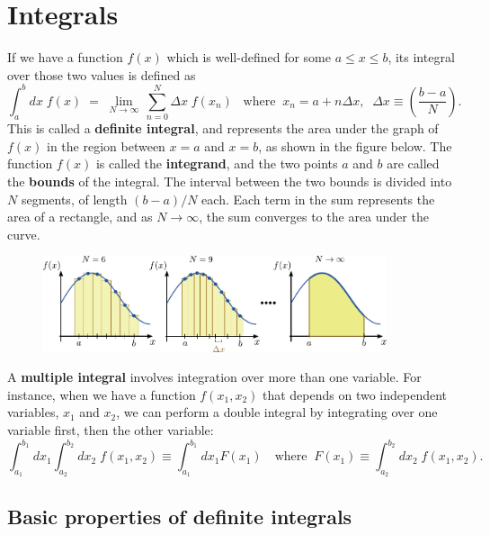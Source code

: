 \documentclass[10pt,a4paper]{article}
\begin{document}
\setcounter{page}{14}

\section{Integrals}
\label{integrals}

If we have a function $f(x)$ which is well-defined for some $a \le x
\le b$, its integral over those two values is defined as
\begin{equation}
  \int_a^b dx\; f(x) \;=\; \lim_{N \rightarrow \infty} \, \sum_{n=0}^{N} \Delta x\; f(x_n) \;\;\;\mathrm{where}\;\; x_n = a + n\Delta x, \;\; \Delta x \equiv \left(\frac{b-a}{N}\right).
\end{equation}
This is called a \textbf{definite integral}, and represents the area
under the graph of $f(x)$ in the region between $x=a$ and $x=b$,
as shown in the figure below. The function $f(x)$ is called the
\textbf{integrand}, and the two points $a$ and $b$ are called the
\textbf{bounds} of the integral. The interval between the two bounds is
divided into $N$ segments, of length $(b-a)/N$ each. Each term in
the sum represents the area of a rectangle, and as
$N\rightarrow \infty$, the sum converges to the area under the curve.

\begin{figure}[h]
  \centering\includegraphics[width=0.9\textwidth]{definite_integral}
\end{figure}

A \textbf{multiple integral} involves integration over more than one
variable. For instance, when we have a function $f(x_1,x_2)$ that
depends on two independent variables, $x_1$ and $x_2$, we can
perform a double integral by integrating over one variable first, then
the other variable:
\begin{equation}
\int_{a_1}^{b_1} dx_1 \int_{a_2}^{b_2} dx_2 \; f(x_1, x_2) \equiv \int_{a_1}^{b_1} dx_1 F(x_1)\quad\text{where}\;\;F(x_1) \equiv \int_{a_2}^{b_2} dx_2 \; f(x_1, x_2).
\end{equation}


\subsection{Basic properties of definite integrals}
\label{basic-properties-of-definite-integrals}
\end{document}
